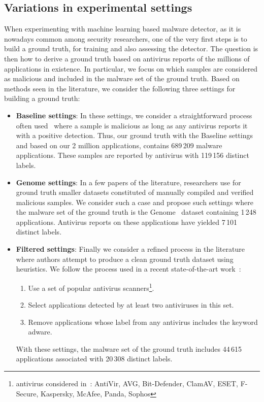 \subsection{Variations in experimental settings}
When experimenting with machine learning based malware detector, as it is nowadays common among security researchers, one of the very first steps is to build a ground truth, for training and also assessing the detector.
The question is then how to derive a ground truth based on antivirus reports of the millions of applications in existence.
In particular, we focus on which samples are considered as malicious and included in the malware set of the ground truth.
Based on methods seen in the literature, we consider the following three settings for building a ground truth:

\begin{itemize}
	\item \textbf{Baseline settings}: In these settings, we consider a straightforward process often used~\cite{allix_empirical_2016,kutylowski_droidminer:_2014} where a sample is malicious as long as any antivirus reports it with a positive detection. Thus, our ground truth with the Baseline settings and based on our 2 million applications, contains 689\,209 malware applications. These samples are reported by antivirus with 119\,156 distinct labels.

	\item \textbf{Genome settings}: In a few papers of the literature, researchers use for ground truth smaller datasets constituted of manually compiled and verified malicious samples. We consider such a case and propose such settings where the malware set of the ground truth is the Genome~\cite{zhou_dissecting_2012} dataset containing 1\,248 applications. Antivirus reports on these applications have yielded 7\,101 distinct labels.

	\item \textbf{Filtered settings}: Finally we consider a refined process in the literature where authors attempt to produce a clean ground truth dataset using heuristics. We follow the process used in a recent state-of-the-art work~\cite{arp_drebin:_2014}:
	      \begin{enumerate}
		      \item Use a set of popular antivirus scanners\footnote{antivirus considered in~\cite{arp_drebin:_2014}: AntiVir, AVG, Bit-Defender, ClamAV, ESET, F-Secure, Kaspersky, McAfee, Panda, Sophos}.
		      \item Select applications detected by at least two antiviruses in this set.
		      \item Remove applications whose label from any antivirus includes the keyword adware.
	      \end{enumerate}
	      With these settings, the malware set of the ground truth includes 44\,615 applications associated with 20\,308 distinct labels.
\end{itemize}

